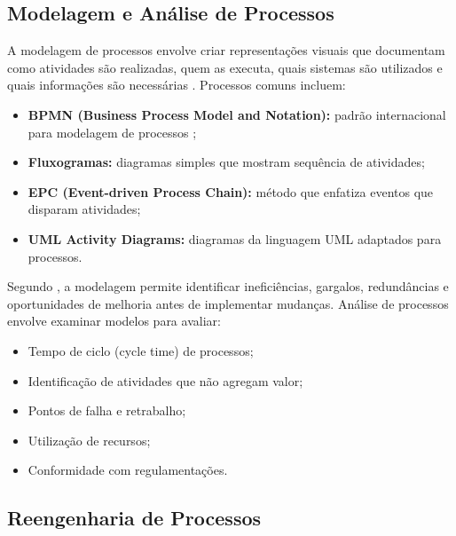 \subsection{Modelagem e Análise de Processos}
A modelagem de processos envolve criar representações visuais que documentam como atividades são realizadas, quem as executa, quais sistemas são utilizados e quais informações são necessárias \cite{aguilarsaven2004}. Processos comuns incluem:
\begin{itemize}
    \item \textbf{BPMN (Business Process Model and Notation):} padrão internacional para modelagem de processos \cite{white2004};
    \item \textbf{Fluxogramas:} diagramas simples que mostram sequência de atividades;
    \item \textbf{EPC (Event-driven Process Chain):} método que enfatiza eventos que disparam atividades;
    \item \textbf{UML Activity Diagrams:} diagramas da linguagem UML adaptados para processos.
\end{itemize}
Segundo \cite{sharp2009}, a modelagem permite identificar ineficiências, gargalos, redundâncias e oportunidades de melhoria antes de implementar mudanças. Análise de processos envolve examinar modelos para avaliar:

\begin{itemize}
    \item Tempo de ciclo (cycle time) de processos;
    \item Identificação de atividades que não agregam valor;
    \item Pontos de falha e retrabalho;
    \item Utilização de recursos;
    \item Conformidade com regulamentações.
\end{itemize}

\subsection{Reengenharia de Processos}

